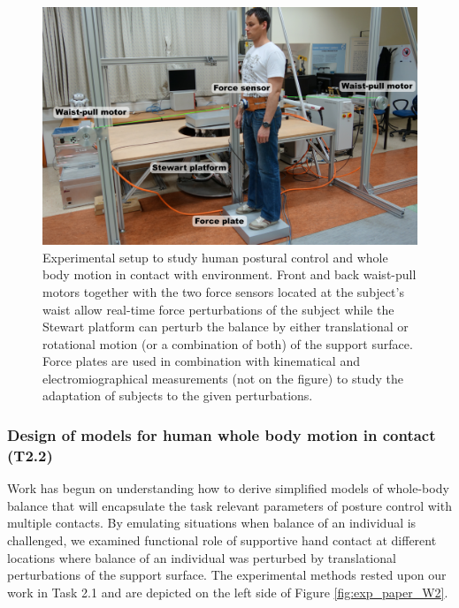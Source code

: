 \documentclass[12pt,a4paper,twoside]{article}
\begin{document}
\begin{figure}
\centering
\includegraphics[width=0.8\hsize]{images/exp_setup_WP2.png}
\caption{Experimental setup to study human postural control and whole body motion in contact with environment. Front and back waist-pull motors together with the two force sensors located at the subject's waist allow real-time force perturbations of the subject while the Stewart platform can perturb the balance by either translational or rotational motion (or a combination of both) of the support surface. Force plates are used in combination with kinematical and electromiographical measurements (not on the figure) to study the adaptation of subjects to the given perturbations.}
\label{fig:exp_protocol_W2}
\end{figure}

\subsubsection{Design of models for human whole body motion in contact (T2.2)}

Work has begun on understanding how to derive simplified models of whole-body balance that will encapsulate the task relevant parameters of posture control with multiple contacts. By emulating situations when balance of an individual is challenged, we examined functional role of supportive hand contact at different locations where balance of an individual was perturbed by translational perturbations of the support surface. The experimental methods rested upon our work in Task 2.1 and are depicted on the left side of Figure \ref{fig:exp_paper_W2}.
\end{document}

